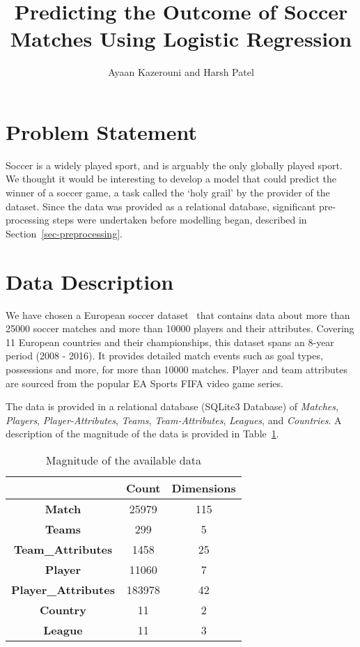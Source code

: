 \documentclass[11pt]{article}
\begin{document}
\title{Predicting the Outcome of Soccer Matches Using Logistic Regression}
\author{Ayaan Kazerouni and Harsh Patel}
\date{}
\maketitle

\section{Problem Statement}
Soccer is a widely played sport, and is arguably the only globally played sport.
We thought it would be interesting to develop a model that could predict the winner of a soccer game, a task called the `holy grail' by the provider of the dataset.
Since the data was provided as a relational database, significant pre-processing steps were undertaken before modelling began, described in Section~\ref{sec-preprocessing}.

\section{Data Description}
We have chosen a European soccer dataset~\cite{mathien1} that contains data about more than 25000 soccer matches and more than 10000 players and their attributes.
Covering 11 European countries and their championships, this dataset spans an 8-year period (2008 - 2016).
It provides detailed match events such as goal types, possessions and more, for more than 10000 matches.
Player and team attributes are sourced from the popular EA Sports FIFA video game series.

The data is provided in a relational database (SQLite3 Database) of \textit{Matches}, \textit{Players}, \textit{Player-Attributes}, \textit{Teams}, \textit{Team-Attributes}, \textit{Leagues}, and \textit{Countries}.
A description of the magnitude of the data is provided in Table~\ref{tab:data-desc}.

\begin{table}[ht]
\centering
\begin{tabular}{|c|c|c|}
\hline
\textbf{}                   & \textbf{Count} & \textbf{Dimensions} \\ \hline
\textbf{Match}              & 25979          & 115                 \\ \hline
\textbf{Teams}              & 299            & 5                   \\ \hline
\textbf{Team\_Attributes}    & 1458           & 25                  \\ \hline
\textbf{Player}             & 11060          & 7                   \\ \hline
\textbf{Player\_Attributes} & 183978         & 42                  \\ \hline
\textbf{Country}            & 11             & 2                   \\ \hline
\textbf{League}             & 11             & 3                   \\ \hline
\end{tabular}
\caption{Magnitude of the available data}
\label{tab:data-desc}
\end{table}
\end{document}

